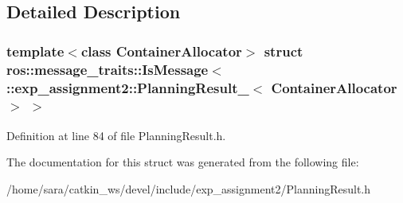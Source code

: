 \subsection{Detailed Description}
\subsubsection*{template$<$class Container\+Allocator$>$\newline
struct ros\+::message\+\_\+traits\+::\+Is\+Message$<$ \+::exp\+\_\+assignment2\+::\+Planning\+Result\+\_\+$<$ Container\+Allocator $>$ $>$}



Definition at line 84 of file Planning\+Result.\+h.



The documentation for this struct was generated from the following file\+:\begin{DoxyCompactItemize}
\item 
/home/sara/catkin\+\_\+ws/devel/include/exp\+\_\+assignment2/Planning\+Result.\+h\end{DoxyCompactItemize}
